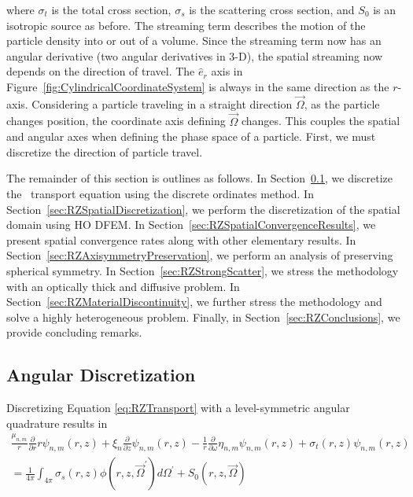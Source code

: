 \documentclass[12pt]{article}
\begin{document}
\noindent where $\sigma_t$ is the total cross section, $\sigma_s$ is the scattering cross section, and $S_0$ is an isotropic source as before. The streaming term describes the motion of the particle density into or out of a volume. Since the streaming term now has an angular derivative (two angular derivatives in 3-D), the spatial streaming now depends on the direction of travel. The $\hat{e}_r$ axis in Figure~\ref{fig:CylindricalCoordinateSystem} is always in the same direction as the $r$-axis. Considering a particle traveling in a straight direction $\vec{\Omega}$, as the particle changes position, the coordinate axis defining $\vec{\Omega}$ changes. This couples the spatial and angular axes when defining the phase space of a particle. First, we must discretize the direction of particle travel.

The remainder of this section is outlines as follows. In Section~\ref{sec:RZAngularDiscretization}, we discretize the \RZ\ transport equation using the discrete ordinates method. In Section~\ref{sec:RZSpatialDiscretization}, we perform the discretization of the spatial domain using HO DFEM. In Section~\ref{sec:RZSpatialConvergenceResults}, we present spatial convergence rates along with other elementary results. In Section~\ref{sec:RZAxisymmetryPreservation}, we perform an analysis of preserving spherical symmetry. In Section~\ref{sec:RZStrongScatter}, we stress the methodology with an optically thick and diffusive problem. In Section~\ref{sec:RZMaterialDiscontinuity}, we further stress the methodology and solve a highly heterogeneous problem. Finally, in Section~\ref{sec:RZConclusions}, we provide concluding remarks.

\subsection{Angular Discretization}
\label{sec:RZAngularDiscretization}
Discretizing Equation \ref{eq:RZTransport} with a level-symmetric angular quadrature results in 
\begin{multline}
\frac{\mu_{n,m}}{r} \frac{\partial}{\partial r} r \psi_{n,m} \left(r,z \right) + \xi_n \frac{\partial}{\partial z} \psi_{n,m} \left(r,z \right) - \frac{1}{r} \frac{\partial}{\partial \omega} \eta_{n,m} \psi_{n,m} \left(r,z \right) + \sigma_t \left(r,z \right) \psi_{n,m} \left(r,z \right) \\
= \frac{1}{4 \pi} \int_{4 \pi} \sigma_s \left(r,z \right) \phi \left(r,z, \vec{\Omega}^\prime \right) d \Omega^\prime + S_0 \left(r,z, \vec{\Omega} \right)
\label{eq:RZSNTransport}
\end{multline}
\end{document}
